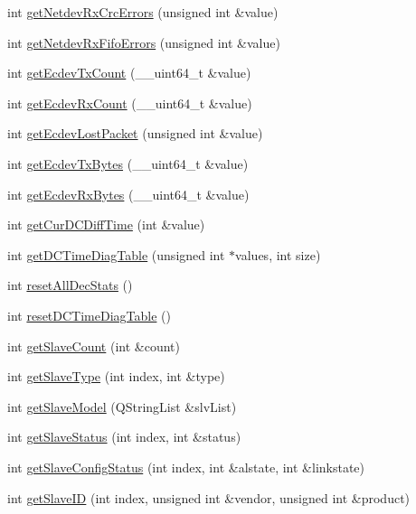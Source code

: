\begin{DoxyCompactItemize}
int \hyperlink{classCUIEcat_a9a6d7227eb81138a671e936dae1488ea}{get\-Netdev\-Rx\-Crc\-Errors} (unsigned int \&value)
\item 
int \hyperlink{classCUIEcat_a6bb2c05f044bf6c0766b50027dc454e7}{get\-Netdev\-Rx\-Fifo\-Errors} (unsigned int \&value)
\item 
int \hyperlink{classCUIEcat_a761302de2176ec87fbe3fd74609f70dd}{get\-Ecdev\-Tx\-Count} (\-\_\-\-\_\-uint64\-\_\-t \&value)
\item 
int \hyperlink{classCUIEcat_af0f350ed72a6a541ded432cbf4c70e56}{get\-Ecdev\-Rx\-Count} (\-\_\-\-\_\-uint64\-\_\-t \&value)
\item 
int \hyperlink{classCUIEcat_a22955872bac93e2cad78bcd3f92f7950}{get\-Ecdev\-Lost\-Packet} (unsigned int \&value)
\item 
int \hyperlink{classCUIEcat_a54cba199d61add01ac1a3e8d9556ee69}{get\-Ecdev\-Tx\-Bytes} (\-\_\-\-\_\-uint64\-\_\-t \&value)
\item 
int \hyperlink{classCUIEcat_abbfab5b1cfa7865b62d65568e8d7717d}{get\-Ecdev\-Rx\-Bytes} (\-\_\-\-\_\-uint64\-\_\-t \&value)
\item 
int \hyperlink{classCUIEcat_ab8f415bfde5990a430b9c914728c704a}{get\-Cur\-D\-C\-Diff\-Time} (int \&value)
\item 
int \hyperlink{classCUIEcat_aa3925bea5f3005eb3148258af76bbb56}{get\-D\-C\-Time\-Diag\-Table} (unsigned int $\ast$values, int size)
\item 
int \hyperlink{classCUIEcat_a8f374b27b638738365452c3af355f985}{reset\-All\-Dec\-Stats} ()
\item 
int \hyperlink{classCUIEcat_a6161809b8f173a498d84b88dd73a7c69}{reset\-D\-C\-Time\-Diag\-Table} ()
\item 
int \hyperlink{classCUIEcat_ab8d3d89cb7f2423c7169e394f8249093}{get\-Slave\-Count} (int \&count)
\item 
int \hyperlink{classCUIEcat_aa76e7a892399d346d2b1cd62df405680}{get\-Slave\-Type} (int index, int \&type)
\item 
int \hyperlink{classCUIEcat_a2f5f74641c1a1e53211148ad9d553625}{get\-Slave\-Model} (Q\-String\-List \&slv\-List)
\item 
int \hyperlink{classCUIEcat_a274705f2b3039015250d7a9905b656ca}{get\-Slave\-Status} (int index, int \&status)
\item 
int \hyperlink{classCUIEcat_a40efffb366ee16bd654f049f99ffcf90}{get\-Slave\-Config\-Status} (int index, int \&alstate, int \&linkstate)
\item 
int \hyperlink{classCUIEcat_a8d4f878e23b62931681cfddce5e8e797}{get\-Slave\-I\-D} (int index, unsigned int \&vendor, unsigned int \&product)
\end{DoxyCompactItemize}
